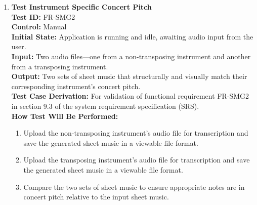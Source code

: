 \documentclass[12pt, titlepage]{article}
\begin{document}
\begin{enumerate}
  \item \textbf{Test Instrument Specific Concert Pitch} \\
    \newline
    \textbf{Test ID:} FR-SMG2 \\
    \textbf{Control:} Manual \\
    \textbf{Initial State:} Application is running and idle, awaiting audio input from the user. \\
    \textbf{Input:} Two audio files—one from a non-transposing instrument and another from a transposing instrument. \\
    \textbf{Output:} Two sets of sheet music that structurally and visually match their corresponding instrument’s concert pitch. \\
    \textbf{Test Case Derivation:} For validation of functional requirement FR-SMG2 in section 9.3 of the system requirement specification (SRS). \\
    \textbf{How Test Will Be Performed:}
    \begin{enumerate}
        \item Upload the non-transposing instrument’s audio file for transcription and save the generated sheet music in a viewable file format.
        \item Upload the transposing instrument’s audio file for transcription and save the generated sheet music in a viewable file format.
        \item Compare the two sets of sheet music to ensure appropriate notes are in concert pitch relative to the input sheet music.
    \end{enumerate}
  

\end{enumerate}
\end{document}
